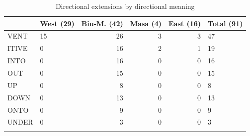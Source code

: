 
\begin{table}
	\caption{Directional extensions by directional meaning}
	\label{tab:directionals}
	\begin{tabularx}{\textwidth}{l Yrrr Y}
		\lsptoprule
	 & West (29)	&	Biu-M. (42)	&	Masa (4)	&	East (16)	&	Total (91)	\\
\midrule
VENT       &    15 &           26 &     3 &     3 &     47 \\
ITIVE      &     0 &           16 &     2 &     1 &     19 \\
INTO       &     0 &           16 &     0 &     0 &     16 \\
OUT        &     0 &           15 &     0 &     0 &     15 \\
UP         &     0 &            8 &     0 &     0 &      8 \\
DOWN       &     0 &           13 &     0 &     0 &     13 \\
ONTO       &     0 &            9 &     0 &     0 &      9 \\
UNDER      &     0 &            3 &     0 &     0 &      3 \\
		\lspbottomrule
	\end{tabularx}
\end{table}

